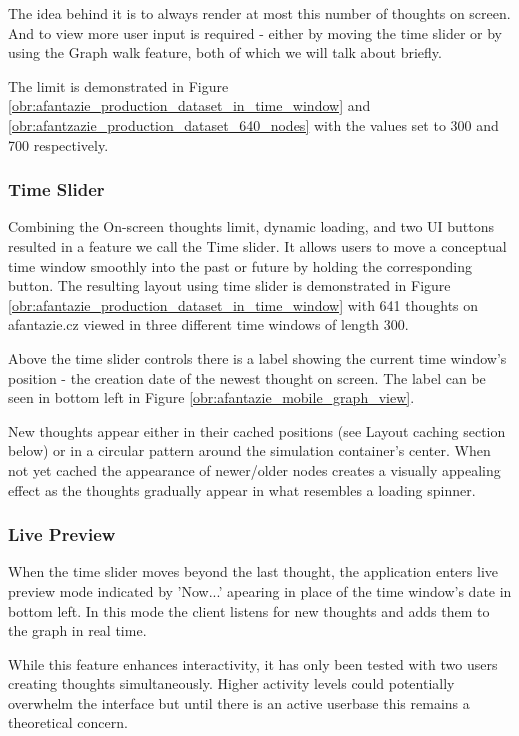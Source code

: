 The idea behind it is to always render at most this number of thoughts on screen.
And to view more user input is required - either by moving the time slider or by using the Graph walk feature, both of which we will talk about briefly.

The limit is demonstrated in Figure \ref{obr:afantazie_production_dataset_in_time_window} and \ref{obr:afantzazie_production_dataset_640_nodes} with the values set to 300 and 700 respectively.

\subsubsection*{Time Slider}
Combining the On-screen thoughts limit, dynamic loading, and two UI buttons resulted in a feature we call the Time slider.
It allows users to move a conceptual time window smoothly into the past or future by holding the corresponding button.
The resulting layout using time slider is demonstrated in Figure \ref{obr:afantazie_production_dataset_in_time_window}
with 641 thoughts on afantazie.cz viewed in three different time windows of length 300.

Above the time slider controls there is a label showing the current time window's position - the creation date of the newest thought on screen.
The label can be seen in bottom left in Figure \ref{obr:afantazie_mobile_graph_view}.

New thoughts appear either in their cached positions (see Layout caching section below) or in a circular pattern around the simulation container’s center.
When not yet cached the appearance of newer/older nodes creates a visually appealing effect as the thoughts gradually appear in what resembles a loading spinner.

\subsubsection*{Live Preview}
When the time slider moves beyond the last thought, the application enters live preview mode indicated by 'Now...' apearing in place of the time window's date in bottom left.
In this mode the client listens for new thoughts and adds them to the graph in real time.

While this feature enhances interactivity, it has only been tested with two users creating thoughts simultaneously.
Higher activity levels could potentially overwhelm the interface but until there is an active userbase this remains
a theoretical concern.

